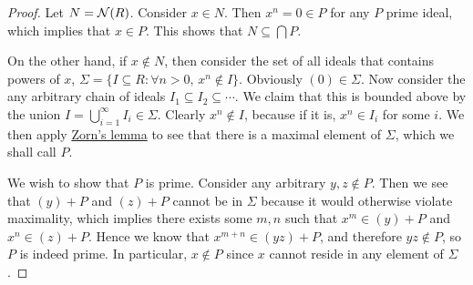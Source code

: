 \begin{proof}
    Let \(N = \operatorname{\mathcal{N}}(R)\).
    Consider \(x \in N\). Then \(x^n = 0 \in P\) for any \(P\) prime ideal,
    which implies that \(x \in P\).
    This shows that \(N \subseteq \bigcap P\).

    On the other hand, if \(x \notin N\),
    then consider the set of all ideals that contains powers of \(x\),
    \(\Sigma = \{I \subseteq R: \forall n > 0,\, x^n \notin I\}\).
    Obviously \((0) \in \Sigma\).
    Now consider the any arbitrary chain of ideals \(I_1 \subseteq I_2 \subseteq \cdots\).
    We claim that this is bounded above by the union
    \(I = \bigcup_{i=1}^\infty I_i \in \Sigma\).
    Clearly \(x^n \notin I\), because if it is, \(x^n \in I_i\) for some \(i\).
    We then apply \hyperref[ax:zorn]{Zorn's lemma} to see that there is a maximal element of \(\Sigma\),
    which we shall call \(P\).

    We wish to show that \(P\) is prime.
    Consider any arbitrary \(y,z \notin P\).
    Then we see that \((y)+P\) and \((z)+P\) cannot be in \(\Sigma\)
    because it would otherwise violate maximality,
    which implies there exists some \(m,n\) such that \(x^m \in (y)+P\) and \(x^n \in (z)+P\).
    Hence we know that \(x^{m+n} \in (yz)+P\),
    and therefore \(yz \notin P\), so \(P\) is indeed prime.
    In particular, \(x \notin P\) since \(x\) cannot reside in any element of \(\Sigma\).
\end{proof}

